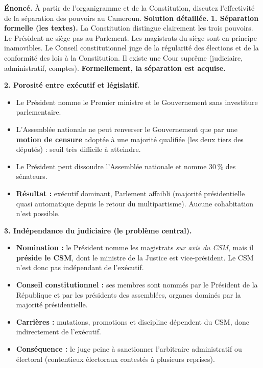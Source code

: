 \documentclass[11pt]{article}
\begin{document}
\begin{exoresolu}
\textbf{Énoncé.} À partir de l'organigramme et de la Constitution, discutez l'effectivité de la séparation des pouvoirs au Cameroun.
\tcblower
\textbf{Solution détaillée.}
\textbf{1. Séparation formelle (les textes).} La Constitution distingue clairement les trois pouvoirs. Le Président ne siège pas au Parlement. Les magistrats du siège sont en principe inamovibles. Le Conseil constitutionnel juge de la régularité des élections et de la conformité des lois à la Constitution. Il existe une Cour suprême (judiciaire, administratif, comptes). \textbf{Formellement, la séparation est acquise.}

\textbf{2. Porosité entre exécutif et législatif.}
\begin{itemize}
\item Le Président nomme le Premier ministre et le Gouvernement sans investiture parlementaire.
\item L'Assemblée nationale ne peut renverser le Gouvernement que par une \textbf{motion de censure} adoptée à une majorité qualifiée (les deux tiers des députés) : seuil très difficile à atteindre.
\item Le Président peut dissoudre l'Assemblée nationale et nomme 30\,\% des sénateurs.
\item \textbf{Résultat :} exécutif dominant, Parlement affaibli (majorité présidentielle quasi automatique depuis le retour du multipartisme). Aucune cohabitation n'est possible.
\end{itemize}

\textbf{3. Indépendance du judiciaire (le problème central).}
\begin{itemize}
\item \textbf{Nomination :} le Président nomme les magistrats \emph{sur avis du CSM}, mais il \textbf{préside le CSM}, dont le ministre de la Justice est vice-président. Le CSM n'est donc pas indépendant de l'exécutif.
\item \textbf{Conseil constitutionnel :} ses membres sont nommés par le Président de la République et par les présidents des assemblées, organes dominés par la majorité présidentielle.
\item \textbf{Carrières :} mutations, promotions et discipline dépendent du CSM, donc indirectement de l'exécutif.
\item \textbf{Conséquence :} le juge peine à sanctionner l'arbitraire administratif ou électoral (contentieux électoraux contestés à plusieurs reprises).
\end{itemize}


\end{exoresolu}
\end{document}
